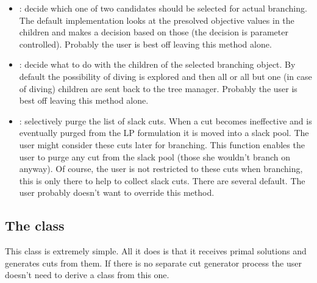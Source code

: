 \begin{itemize}
\item {}: decide which one of two
  candidates should be selected for actual branching. The default
  implementation looks at the presolved objective values in the children and
  makes a decision based on those (the decision is parameter controlled).
  Probably the user is best off leaving this method alone.

\item {}: decide what to do with the children
  of the selected branching object. By default the possibility of diving is
  explored and then all or all but one (in case of diving) children are sent
  back to the tree manager. Probably the user is best off leaving this method
  alone. 

\item {}: selectively purge the list of slack cuts.
  When a cut becomes ineffective and is eventually purged from the LP
  formulation it is moved into a slack pool. The user might
  consider these cuts later for branching. This function enables the user
  to purge any cut from the slack pool (those she wouldn't branch on
  anyway). Of course, the user is not restricted to these cuts when
  branching, this is only there to help to collect slack cuts. There are
  several default. The user probably doesn't want to override this method.

\end{itemize}

\subsection{The  class}
This class is extremely simple. All it does is that it receives primal
solutions and generates cuts from them. If there is no separate cut generator
process the user doesn't need to derive a class from this one.

